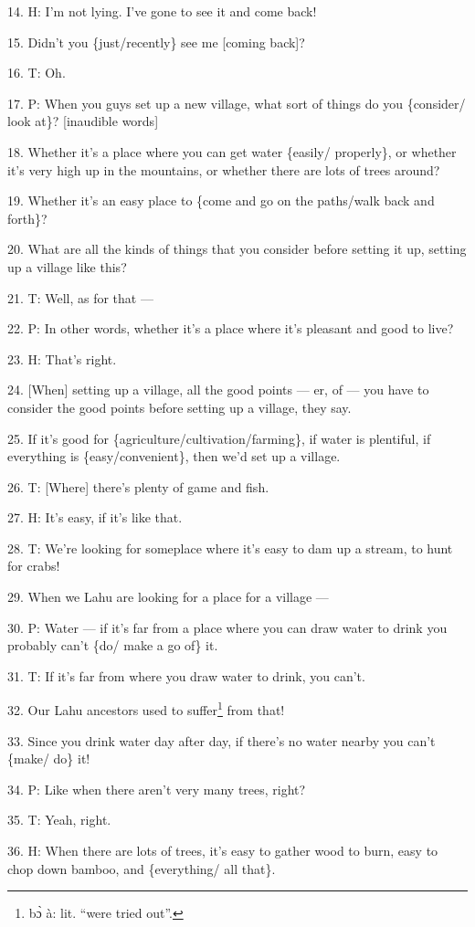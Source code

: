 14. H: I'm not lying. I've gone to see it and come back!

15. Didn't you \{just/recently\} see me [coming back]?

16. T: Oh.

17. P: When you guys set up a new village, what sort of things do you \{consider/
look at\}? [inaudible words]

18. Whether it's a place where you can get water \{easily/ properly\}, or whether
it's very high up in the mountains, or whether there are lots of trees around?

19. Whether it's an easy place to \{come and go on the paths/walk back and forth\}?

20. What are all the kinds of things that you consider before setting it up, setting
up a village like this?

21. T: Well, as for that ---

22. P: In other words, whether it's a place where it's pleasant and good to live?

23. H: That's right.

24. [When] setting up a village, all the good points --- er, of --- you have to
consider the good points before setting up a village, they say.

25. If it's good for \{agriculture/cultivation/farming\}, if water is plentiful,
if everything is \{easy/convenient\}, then we'd set up a village.

26. T: [Where] there's plenty of game and fish.

27. H: It's easy, if it's like that.

28. T: We're looking for someplace where it's easy to dam up a stream, to hunt
for crabs!

29. When we Lahu are looking for a place for a village ---

30. P: Water --- if it's far from a place where you can draw water to drink you
probably can't \{do/ make a go of\} it.

31. T: If it's far from where you draw water to drink, you can't.

32. Our Lahu ancestors used to suffer\footnote{bɔ̀ à: lit. ``were tried out''.} from that!

33. Since you drink water day after day, if there's no water nearby you can't \{make/
do\} it!

34. P: Like when there aren't very many trees, right?

35. T: Yeah, right.

36. H: When there are lots of trees, it's easy to gather wood to burn, easy to
chop down bamboo, and \{everything/ all that\}.


